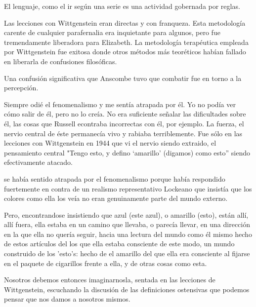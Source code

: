 El lenguaje, como el ir según una serie es una actividad gobernada por reglas. 



Las lecciones con Wittgenstein eran directas y con franqueza. Esta metodología
carente de cualquier parafernalia era inquietante para algunos, pero fue
tremendamente liberadora para Elizabeth. La metodología terapéutica empleada por
Wittgenstein fue exitosa donde otros métodos más teoréticos habían fallado en
liberarla de confusiones filosóficas.\autocite[loc 9853 Chapter 4, Section 24,
\S5]{monk1991duty}

Una confusión significativa que Anscombe tuvo que combatir fue en torno a la
percepción.

Siempre odié el fenomenalismo y me sentía atrapada por él. Yo no podía ver cómo
salir de él, pero no lo creía. No era suficiente señalar las dificultades sobre
él, las cosas que Russell econtraba incorrectas con él, por ejemplo. La fuerza,
el nervio central de éste permanecía vivo y rabiaba terriblemente. Fue sólo en
las lecciones con Wittgenstein en 1944 que vi el nervio siendo extraido, el
pensamiento central "Tengo esto, y defino `amarillo' (digamos) como esto''
siendo efectivamente atacado.



se había sentido atrapada por el fenomenalismo porque había respondido
fuertemente en contra de un realismo representativo Lockeano que insistía que
los colores como ella los veía no eran genuinamente parte del mundo externo.

Pero, encontrandose insistiendo que azul (este azul), o amarillo (esto), están
allí, allí fuera, ella estaba en un camino que llevaba, o parecía llevar, en una
dirección en la que ella no quería seguir, hacia una lectura del mundo como él
mismo hecho de estos artículos del los que ella estaba consciente de este modo,
un mundo construido de los 'esto's: hecho de el amarillo del que ella era
consciente al fijarse en el paquete de cigarillos frente a ella, y de otras
cosas como esta.

Nosotros debemos entonces imaginarnosla, sentada en las lecciones de
Wittgenstein, escuchando la discusión de las definiciones ostensivas que podemos
pensar que nos damos a nosotros mismos.

